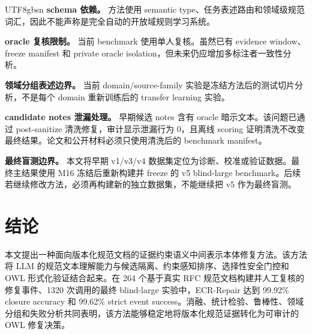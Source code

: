 \documentclass[11pt]{article}
\begin{document}
\begin{CJK*}{UTF8}{gbsn}
\textbf{schema 依赖。} 方法使用 semantic type、任务表述路由和领域级规范词汇，因此不能声称是完全自动的开放域规则学习系统。

\textbf{oracle 复核限制。} 当前 benchmark 使用单人复核。虽然已有 evidence window、freeze manifest 和 private oracle isolation，但未来仍应增加多标注者一致性分析。

\textbf{领域分组表述边界。} 当前 domain/source-family 实验是冻结方法后的测试切片分析，不是每个 domain 重新训练后的 transfer learning 实验。

\textbf{candidate notes 泄漏处理。} 早期候选 notes 含有 oracle 暗示文本。该问题已通过 post-sanitize 清洗修复，审计显示泄漏行为 0，且离线 scoring 证明清洗不改变最终结果。论文和公开材料必须只使用清洗后的 benchmark manifest。

\textbf{最终盲测边界。} 本文将早期 v1/v3/v4 数据集定位为诊断、校准或验证数据。最终主结果使用 M16 冻结后重新构建并 freeze 的 v5 blind-large benchmark。后续若继续修改方法，必须再构建新的独立数据集，不能继续把 v5 作为最终盲测。

\section{结论}

本文提出一种面向版本化规范文档的证据约束语义中间表示本体修复方法。该方法将 LLM 的规范文本理解能力与候选隔离、约束感知排序、选择性安全门控和 OWL 形式化验证结合起来。在 264 个基于真实 RFC 规范文档构建并人工复核的修复事件、1320 次调用的最终 blind-large 实验中，ECR-Repair 达到 99.92\% closure accuracy 和 99.62\% strict event success。消融、统计检验、鲁棒性、领域分组和失败分析共同表明，该方法能够稳定地将版本化规范证据转化为可审计的 OWL 修复决策。




\end{CJK*}
\end{document}
